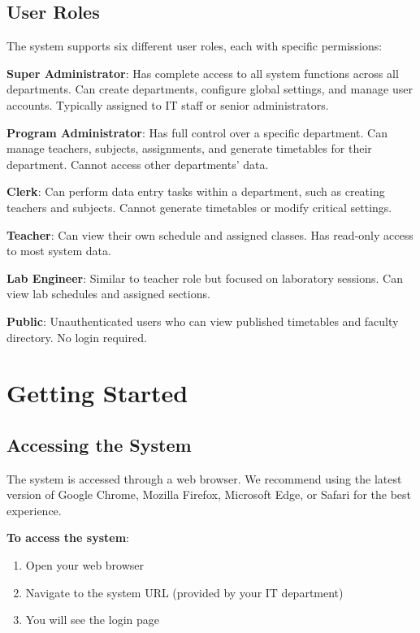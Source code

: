 \documentclass[12pt,a4paper]{article}
\begin{document}
\subsection{User Roles}

The system supports six different user roles, each with specific permissions:

\textbf{Super Administrator}: Has complete access to all system functions across all departments. Can create departments, configure global settings, and manage user accounts. Typically assigned to IT staff or senior administrators.

\textbf{Program Administrator}: Has full control over a specific department. Can manage teachers, subjects, assignments, and generate timetables for their department. Cannot access other departments' data.

\textbf{Clerk}: Can perform data entry tasks within a department, such as creating teachers and subjects. Cannot generate timetables or modify critical settings.

\textbf{Teacher}: Can view their own schedule and assigned classes. Has read-only access to most system data.

\textbf{Lab Engineer}: Similar to teacher role but focused on laboratory sessions. Can view lab schedules and assigned sections.

\textbf{Public}: Unauthenticated users who can view published timetables and faculty directory. No login required.


\section{Getting Started}

\subsection{Accessing the System}

The system is accessed through a web browser. We recommend using the latest version of Google Chrome, Mozilla Firefox, Microsoft Edge, or Safari for the best experience.

\textbf{To access the system}:
\begin{enumerate}
\item Open your web browser
\item Navigate to the system URL (provided by your IT department)
\item You will see the login page
\end{enumerate}
\end{document}
